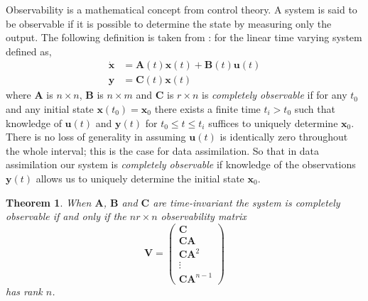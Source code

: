 \documentclass[11pt]{article}
\newtheorem{theorem}{Theorem}[section]
\begin{document}
Observability is a mathematical concept from control theory. A system is said to be observable if it is possible to determine the state by measuring only the output. The following definition is taken from \citet{barnett1985introduction}: for the linear time varying system defined as,
\begin{align}
\dot{\textbf{x}} &= \textbf{A}(t)\textbf{x}(t) +\textbf{B}(t)\textbf{u}(t) \\
\textbf{y} &= \textbf{C}(t)\textbf{x}(t)
\end{align}
where $\textbf{A}$ is $n \times n$, $\textbf{B}$ is $n \times m$ and $\textbf{C}$ is $r \times n$ is \textit{completely observable} if for any $t_0$ and any initial state $\textbf{x}(t_0) = \textbf{x}_0$ there exists a finite time $t_i > t_0$ such that knowledge of $\textbf{u}(t)$ and $\textbf{y}(t)$ for $t_0 \leq t \leq t_i$ suffices to uniquely determine $\textbf{x}_0$. There is no loss of generality in assuming $\textbf{u}(t)$ is identically zero throughout the whole interval; this is the case for data assimilation. So that in data assimilation our system is \textit{completely observable} if knowledge of the observations $\textbf{y}(t)$ allows us to uniquely determine the initial state $\textbf{x}_0$.

\begin{theorem} \label{thm:observable}
When $\textbf{A}$, $\textbf{B}$ and $\textbf{C}$ are time-invariant the system is completely observable if and only if the $nr \times n$ observability matrix
\begin{equation}
\mathbf{V}=
\begin{pmatrix}
\mathbf{C} \\
\mathbf{C}\mathbf{A}\\
\mathbf{C}\mathbf{A}^{2}\\
\vdots \\
\mathbf{C}\mathbf{A}^{n-1}
\end{pmatrix}
\end{equation}
has rank $n$.
\end{theorem}
\end{document}
